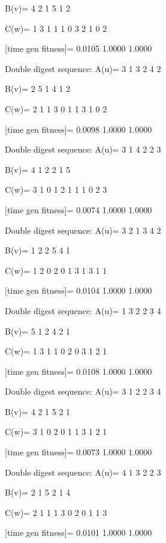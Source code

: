 B(v)=
     4     2     1     5     1     2

C(w)=
     1     3     1     1     1     0     3     2     1     0     2

[time gen fitness]=
    0.0105    1.0000    1.0000

Double digest sequence:
A(u)=
     3     1     3     2     4     2

B(v)=
     2     5     1     4     1     2

C(w)=
     2     1     1     3     0     1     1     3     1     0     2

[time gen fitness]=
    0.0098    1.0000    1.0000

Double digest sequence:
A(u)=
     3     1     4     2     2     3

B(v)=
     4     1     2     2     1     5

C(w)=
     3     1     0     1     2     1     1     1     0     2     3

[time gen fitness]=
    0.0074    1.0000    1.0000

Double digest sequence:
A(u)=
     3     2     1     3     4     2

B(v)=
     1     2     2     5     4     1

C(w)=
     1     2     0     2     0     1     3     1     3     1     1

[time gen fitness]=
    0.0104    1.0000    1.0000

Double digest sequence:
A(u)=
     1     3     2     2     3     4

B(v)=
     5     1     2     4     2     1

C(w)=
     1     3     1     1     0     2     0     3     1     2     1

[time gen fitness]=
    0.0108    1.0000    1.0000

Double digest sequence:
A(u)=
     3     1     2     2     3     4

B(v)=
     4     2     1     5     2     1

C(w)=
     3     1     0     2     0     1     1     3     1     2     1

[time gen fitness]=
    0.0073    1.0000    1.0000

Double digest sequence:
A(u)=
     4     1     3     2     2     3

B(v)=
     2     1     5     2     1     4

C(w)=
     2     1     1     1     3     0     2     0     1     1     3

[time gen fitness]=
    0.0101    1.0000    1.0000

